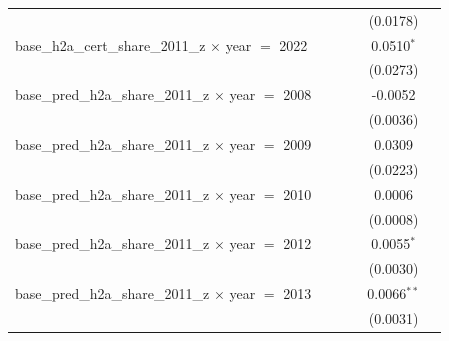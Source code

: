 \begin{tabular}{lccccc}
                                                                &                    &                 &                       & (0.0178)                   &   \\   
   base\_h2a\_cert\_share\_2011\_z $\times$ year $=$ 2022       &                    &                 &                       & 0.0510$^{*}$               &   \\   
                                                                &                    &                 &                       & (0.0273)                   &   \\   
   base\_pred\_h2a\_share\_2011\_z $\times$ year $=$ 2008       &                    &                 &                       & -0.0052                    &   \\   
                                                                &                    &                 &                       & (0.0036)                   &   \\   
   base\_pred\_h2a\_share\_2011\_z $\times$ year $=$ 2009       &                    &                 &                       & 0.0309                     &   \\   
                                                                &                    &                 &                       & (0.0223)                   &   \\   
   base\_pred\_h2a\_share\_2011\_z $\times$ year $=$ 2010       &                    &                 &                       & 0.0006                     &   \\   
                                                                &                    &                 &                       & (0.0008)                   &   \\   
   base\_pred\_h2a\_share\_2011\_z $\times$ year $=$ 2012       &                    &                 &                       & 0.0055$^{*}$               &   \\   
                                                                &                    &                 &                       & (0.0030)                   &   \\   
   base\_pred\_h2a\_share\_2011\_z $\times$ year $=$ 2013       &                    &                 &                       & 0.0066$^{**}$              &   \\   
                                                                &                    &                 &                       & (0.0031)                   &   \\   

\end{tabular}
